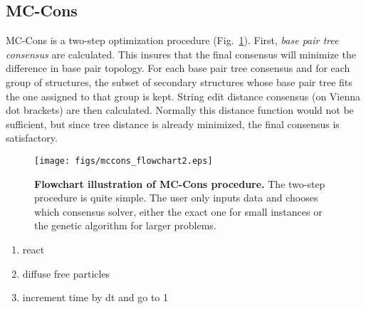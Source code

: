 \documentclass[10pt,letterpaper]{article}
\begin{document}
\subsection*{MC-Cons}

MC-Cons is a two-step optimization procedure (Fig.~\ref{fig1}). First, \textit{base pair tree consensus} are calculated. This insures that the final consensus will minimize the difference in base pair topology.
For each base pair tree consensus and for each group of structures, the subset of secondary structures whose base pair tree fits the one assigned to that group is kept. String edit distance consensus (on Vienna dot brackets) are then calculated. Normally this distance function would not be sufficient, but since tree distance is already minimized, the final consensus is satisfactory.\newline



\begin{figure}[h]
\begin{center}
\texttt{[image: figs/mccons\_flowchart2.eps]}
\caption{{\bf Flowchart illustration of MC-Cons procedure.}
The two-step procedure is quite simple. The user only inputs data and chooses which consensus solver, either the exact one for small instances or the genetic algorithm for larger problems.}
\label{fig1}
\end{center}
\end{figure}





\newpage




\begin{enumerate}
\item{react}
\item{diffuse free particles}
\item{increment time by dt and go to 1}
\end{enumerate}
\end{document}
